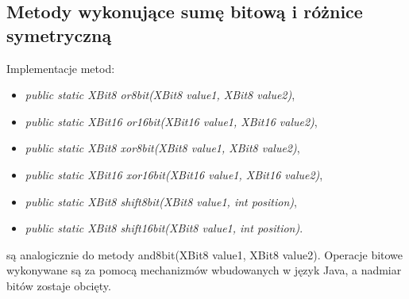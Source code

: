 \subsection{Metody wykonujące sumę bitową i różnice symetryczną}
Implementacje metod:
\begin{itemize}  
	\item \emph{public static XBit8 or8bit(XBit8 value1, XBit8 value2)},
	\item \emph{public static XBit16 or16bit(XBit16 value1, XBit16 value2)},
	\item \emph{public static XBit8 xor8bit(XBit8 value1, XBit8 value2)},
	\item \emph{public static XBit16 xor16bit(XBit16 value1, XBit16 value2)},
	\item \emph{public static XBit8 shift8bit(XBit8 value1, int position)},
	\item \emph{public static XBit8 shift16bit(XBit8 value1, int position)}.
\end{itemize}
są analogicznie do metody and8bit(XBit8 value1, XBit8 value2). Operacje bitowe wykonywane są za pomocą mechanizmów wbudowanych w język Java, a nadmiar bitów zostaje obcięty.